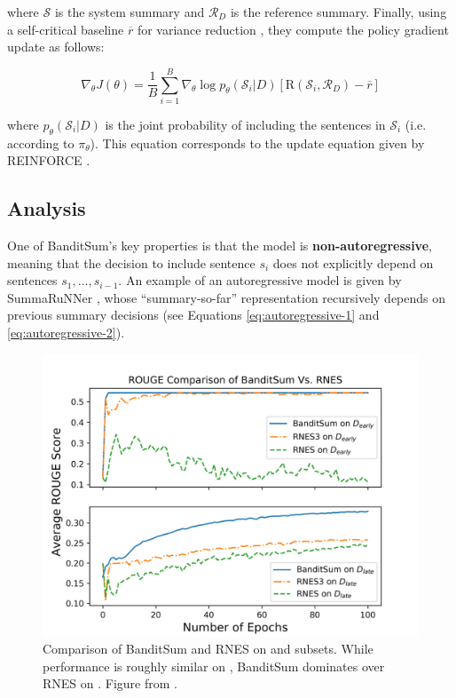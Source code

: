 where $\mathcal{S}$ is the system summary and $\mathcal{R}_D$ is the reference summary. Finally, using a self-critical baseline $\overline{r}$ for variance reduction \parencite{rennie2017self}, they compute the policy gradient update as follows:

\begin{equation}
    \nabla_\theta J(\theta) = \frac{1}{B} \sum_{i=1}^{B} \nabla_\theta \log p_\theta(\mathcal{S}_i \vert D)  \left[\mathrm{R}(\mathcal{S}_i, \mathcal{R}_D) - \overline{r} \right] 
\end{equation}

where $p_\theta (\mathcal{S}_i \vert D)$ is the joint probability of including the sentences in $\mathcal{S}_i$ (i.e. according to $\pi_\theta$). This equation corresponds to the update equation given by REINFORCE \cite{williams1992simple}.

\subsection{Analysis}
One of BanditSum's key properties is that the model is \textbf{non-autoregressive}, meaning that the decision to include sentence $s_i$ does not explicitly depend on sentences $s_1,\dots,s_{i-1}$. An example of an autoregressive model is given by SummaRuNNer \parencite{ext5_summarunner}, whose ``summary-so-far'' representation recursively depends on previous summary decisions (see Equations \ref{eq:autoregressive-1} and \ref{eq:autoregressive-2}).

\begin{figure}[t]
    \centering
    \includegraphics[width=0.8\linewidth]{fig/bsum_early_late.png}
    \caption[Comparison of BanditSum and RNES on \Dearly{} and \Dlate{} subsets.]{Comparison of BanditSum and RNES on \Dearly{} and \Dlate{} subsets. While performance is roughly similar on \Dearly{}, BanditSum dominates over RNES on \Dlate{}. Figure from \cite{dong2018banditsum}.}
    \label{fig:bsum_early_late}
\end{figure}

